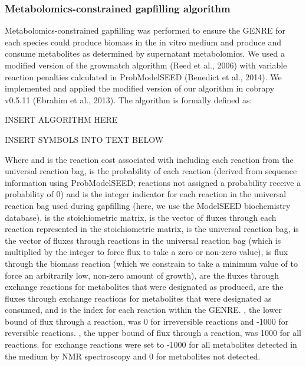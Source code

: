 \documentclass[11pt,twocolumn,notitlepage,openany,twoside]{book}
\begin{document}
\begin{refsection}
\subsubsection{Metabolomics-constrained gapfilling algorithm}

Metabolomics-constrained gapfilling was performed to ensure the GENRE for each species could produce biomass in the in vitro medium and produce and consume metabolites as determined by supernatant metabolomics. We used a modified version of the growmatch algorithm (Reed et al., 2006) with variable reaction penalties calculated in ProbModelSEED (Benedict et al., 2014). We implemented and applied the modified version of our algorithm in cobrapy v0.5.11 (Ebrahim et al., 2013). The algorithm is formally defined as:

INSERT ALGORITHM HERE

INSERT SYMBOLS INTO TEXT BELOW

Where  and is the reaction cost associated with including each reaction from the universal reaction bag,  is the probability of each reaction (derived from sequence information using ProbModelSEED; reactions not assigned a probability receive a probability of 0) and is the integer indicator for each reaction  in the universal reaction bag used during gapfilling (here, we use the ModelSEED biochemistry database).  is the stoichiometric matrix,  is the vector of fluxes through each reaction represented in the stoichiometric matrix,  is the universal reaction bag,  is the vector of fluxes through reactions in the universal reaction bag (which is multiplied by the integer to force flux to take a zero or non-zero value),  is flux through the biomass reaction (which we constrain to take a minimum value of  to force an arbitrarily low, non-zero amount of growth),  are the fluxes through exchange reactions for metabolites that were designated as produced,  are the fluxes through exchange reactions for metabolites that were designated as consumed, and  is the index for each reaction within the GENRE. , the lower bound of flux through a reaction, was 0 for irreversible reactions and -1000 for reversible reactions. , the upper bound of flux through a reaction, was 1000 for all reactions. for exchange reactions were set to -1000 for all metabolites detected in the medium by NMR spectroscopy and 0 for metabolites not detected.


\end{refsection}
\end{document}
